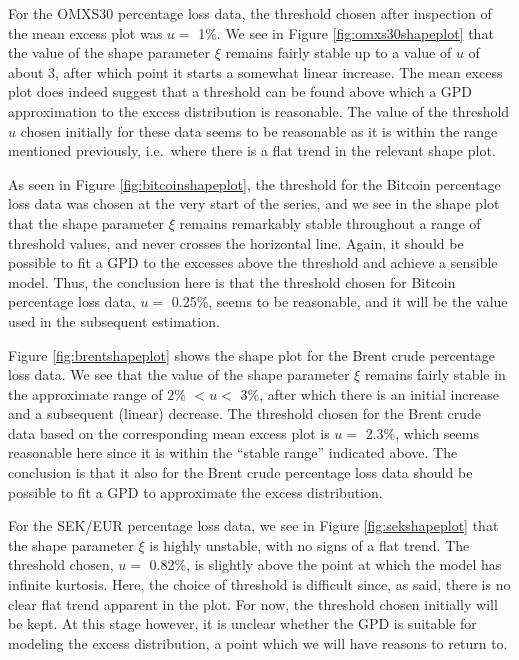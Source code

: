 \documentclass[a4paper,11pt]{article}
\theoremstyle{definition}
\theoremstyle{definition}
\theoremstyle{definition}
\theoremstyle{definition}
\theoremstyle{remark}
\begin{document}
For the OMXS30 percentage loss data, the threshold chosen after inspection of the mean excess plot was \(u =\) 1\%. We see in Figure \ref{fig:omxs30shapeplot} that the value of the shape parameter \(\xi\) remains fairly stable up to a value of \(u\) of about 3, after which point it starts a somewhat linear increase. The mean excess plot does indeed suggest that a threshold can be found above which a GPD approximation to the excess distribution is reasonable. The value of the threshold \(u\) chosen initially for these data seems to be reasonable as it is within the range mentioned previously, i.e.~where there is a flat trend in the relevant shape plot.

As seen in Figure \ref{fig:bitcoinshapeplot}, the threshold for the Bitcoin percentage loss data was chosen at the very start of the series, and we see in the shape plot that the shape parameter \(\xi\) remains remarkably stable throughout a range of threshold values, and never crosses the horizontal line. Again, it should be possible to fit a GPD to the excesses above the threshold and achieve a sensible model. Thus, the conclusion here is that the threshold chosen for Bitcoin percentage loss data, \(u =\) 0.25\%, seems to be reasonable, and it will be the value used in the subsequent estimation.

Figure \ref{fig:brentshapeplot} shows the shape plot for the Brent crude percentage loss data. We see that the value of the shape parameter \(\xi\) remains fairly stable in the approximate range of \(2\)\% \(< u <\) \(3\)\%, after which there is an initial increase and a subsequent (linear) decrease. The threshold chosen for the Brent crude data based on the corresponding mean excess plot is \(u =\) 2.3\%, which seems reasonable here since it is within the ``stable range'' indicated above. The conclusion is that it also for the Brent crude percentage loss data should be possible to fit a GPD to approximate the excess distribution.

For the SEK/EUR percentage loss data, we see in Figure \ref{fig:sekshapeplot} that the shape parameter \(\xi\) is highly unstable, with no signs of a flat trend. The threshold chosen, \(u =\) 0.82\%, is slightly above the point at which the model has infinite kurtosis. Here, the choice of threshold is difficult since, as said, there is no clear flat trend apparent in the plot. For now, the threshold chosen initially will be kept. At this stage however, it is unclear whether the GPD is suitable for modeling the excess distribution, a point which we will have reasons to return to.
\end{document}
